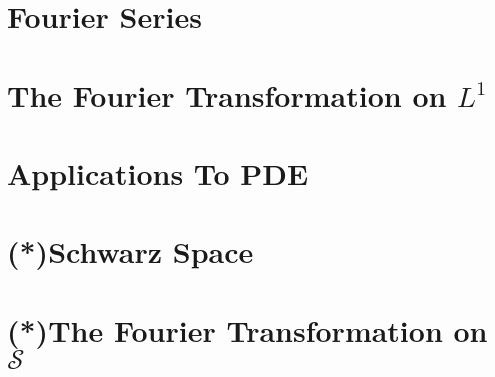 \section{Fourier Series}
\section{The Fourier Transformation on $L^{1}$}
\section{Applications To PDE}
\section{(*)Schwarz Space}
\section{(*)The Fourier Transformation on $\mathscr{S}$}